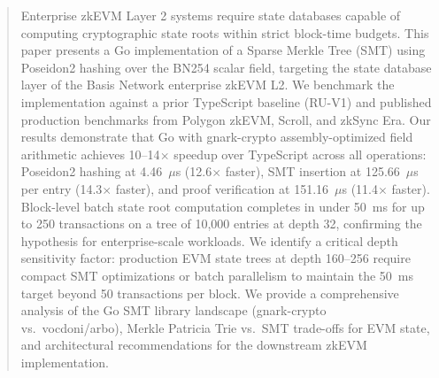 \begin{abstract}

Enterprise zkEVM Layer 2 systems require state databases capable of
computing cryptographic state roots within strict block-time budgets.
This paper presents a Go implementation of a Sparse Merkle Tree (SMT)
using Poseidon2 hashing over the BN254 scalar field, targeting the
state database layer of the Basis Network enterprise zkEVM L2. We
benchmark the implementation against a prior TypeScript baseline
(RU-V1) and published production benchmarks from Polygon zkEVM, Scroll,
and zkSync Era. Our results demonstrate that Go with gnark-crypto
assembly-optimized field arithmetic achieves 10--14$\times$ speedup over
TypeScript across all operations: Poseidon2 hashing at 4.46~$\mu$s
(12.6$\times$ faster), SMT insertion at 125.66~$\mu$s per entry
(14.3$\times$ faster), and proof verification at 151.16~$\mu$s
(11.4$\times$ faster). Block-level batch state root computation
completes in under 50~ms for up to 250 transactions on a tree of
10,000 entries at depth 32, confirming the hypothesis for
enterprise-scale workloads. We identify a critical depth sensitivity
factor: production EVM state trees at depth 160--256 require compact
SMT optimizations or batch parallelism to maintain the 50~ms target
beyond 50 transactions per block. We provide a comprehensive analysis
of the Go SMT library landscape (gnark-crypto vs.\ vocdoni/arbo),
Merkle Patricia Trie vs.\ SMT trade-offs for EVM state, and
architectural recommendations for the downstream zkEVM implementation.

\end{abstract}
